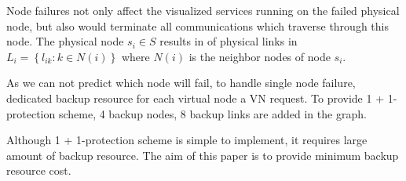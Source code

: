 Node failures not only affect the visualized services running on the failed physical node, but also would terminate all communications which traverse through this node. The  physical node $ {s_i} \in S $ results in  of physical links in ${L_i} = \left\{ {{l_{ik}}:k \in N(i)} \right\}$  where ${N(i)}$ is the neighbor nodes of node $ {s_i} $.

As we can not predict which node will fail, to handle  single node failure,  dedicated backup resource for each virtual node  a VN request.   To provide 1 + 1-protection scheme,  4 backup nodes, 8 backup links are added in the graph.

Although 1 + 1-protection scheme is simple to implement, it requires large amount of  backup resource. The aim of this paper is to provide  minimum backup resource cost.




%
%
%
%
%
%
%
